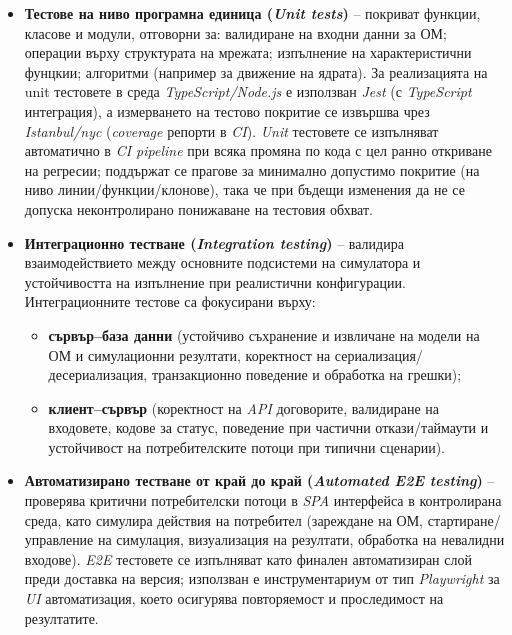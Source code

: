 \begin{itemize}
    \item \textbf{Тестове на ниво програмна единица (\textit{Unit tests})} -- покриват функции, класове и модули, отговорни за: валидиране на входни данни за ОМ; операции върху структурата на мрежата; изпълнение на характеристични фунцкии; алгоритми (например за движение на ядрата). За реализацията на unit тестовете в среда \textit{TypeScript/Node.js} е използван \textit{Jest} (с \textit{TypeScript} интеграция), а измерването на тестово покритие се извършва чрез \textit{Istanbul/nyc} (\textit{coverage} репорти в \textit{CI}). \textit{Unit} тестовете се изпълняват автоматично в \textit{CI pipeline} при всяка промяна по кода с цел ранно откриване на регресии; поддържат се прагове за минимално допустимо покритие (на ниво линии/функции/клонове), така че при бъдещи изменения да не се допуска неконтролирано понижаване на тестовия обхват.

    \item \textbf{Интеграционно тестване (\textit{Integration testing})} -- валидира взаимодействието между основните подсистеми на симулатора и устойчивостта на изпълнение при реалистични конфигурации. Интеграционните тестове са фокусирани върху:
    \begin{itemize}
        \item \textbf{сървър–база данни} (устойчиво съхранение и извличане на модели на ОМ и симулационни резултати, коректност на сериализация/десериализация, транзакционно поведение и обработка на грешки);
        \item \textbf{клиент–сървър} (коректност на \textit{API} договорите, валидиране на входовете, кодове за статус, поведение при частични откази/таймаути и устойчивост на потребителските потоци при типични сценарии).
    \end{itemize}

    \item \textbf{Автоматизирано тестване от край до край (\textit{Automated E2E testing})} -- проверява критични потребителски потоци в \textit{SPA} интерфейса в контролирана среда, като симулира действия на потребител (зареждане на ОМ, стартиране/управление на симулация, визуализация на резултати, обработка на невалидни входове). \textit{E2E} тестовете се изпълняват като финален автоматизиран слой преди доставка на версия; използван е инструментариум от тип \textit{Playwright} за \textit{UI} автоматизация, което осигурява повторяемост и проследимост на резултатите.


\end{itemize}
